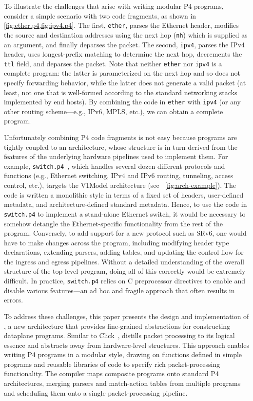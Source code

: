 \documentclass[letterpaper,twocolumn,10pt]{article}
\begin{document}
To illustrate the challenges that arise with writing modular P4
programs, consider a simple scenario with two code fragments, as shown
in \cref{fig:ether.p4,fig:ipv4.p4}. The first, \texttt{ether}, parses
the Ethernet header, modifies the source and destination addresses
using the next hop (\texttt{nh}) which is supplied as an argument, and
finally deparses the packet. The second, \texttt{ipv4}, parses the
IPv4 header, uses longest-prefix matching to determine the next hop,
decrements the \texttt{ttl} field, and deparses the packet. Note that
neither \texttt{ether} nor \texttt{ipv4} is a complete program: the
latter is parameterized on the next hop and so does not specify
forwarding behavior, while the latter does not generate a valid packet
(at least, not one that is well-formed according to the standard
networking stacks implemented by end hosts). By combining the code in
\texttt{ether} with \texttt{ipv4} (or any other routing scheme---e.g.,
IPv6, MPLS, etc.), we can obtain a complete program.

Unfortunately combining P4 code fragments is not easy because programs
are tightly coupled to an architecture, whose structure is in turn
derived from the features of the underlying hardware pipelines used to
implement them. For example, \texttt{switch.p4}~\cite{switch.p4},
which handles several dozen different protocols and functions (e.g.,
Ethernet switching, IPv4 and IPv6 routing, tunneling, access control,
etc.), targets the V1Model architecture (see
~\cref{fig:arch-example}). The code is written a monolithic style in
terms of a fixed set of headers, user-defined metadata, and
architecture-defined standard metadata. Hence, to use the code in
\texttt{switch.p4} to implement a stand-alone Ethernet switch, it
would be necessary to somehow detangle the Ethernet-specific
functionality from the rest of the program. Conversely, to add support
for a new protocol such as SRv6, one would have to make changes across
the program, including modifying header type declarations, extending
parsers, adding tables, and updating the control flow for the ingress
and egress pipelines. Without a detailed understanding of the overall
structure of the top-level program, doing all of this correctly would
be extremely difficult. In practice, \texttt{switch.p4} relies on C
preprocessor directives to enable and disable various features---an ad
hoc and fragile approach that often results in errors.

To address these challenges, this paper presents the design and
implementation of \ulang, a new architecture that provides
fine-grained abstractions for constructing dataplane programs. Similar
to Click~\cite{Kohler:2000:CMR:354871.354874}, \ulang distills packet
processing to its logical essence and abstracts away from
hardware-level structures. This approach enables writing P4 programs
in a modular style, drawing on functions defined in simple programs
and reusable libraries of code to specify rich packet-processing
functionality. The \ucomp compiler maps composite programs onto
standard P4 architectures, merging parsers and match-action tables
from multiple programs and scheduling them onto a single
packet-processing pipeline.
\end{document}

